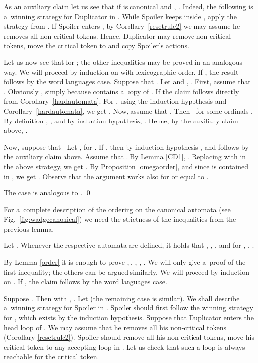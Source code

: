 \documentclass{LMCS}
\begin{document}
\proof As an auxiliary claim let us see that if  is canonical and , . Indeed, the following is a~winning strategy for Duplicator in . While Spoiler keeps inside , apply the strategy from . If Spoiler enters , by Corollary~\ref{resetrule2} we may assume he removes all non-critical tokens. Hence, Duplicator may remove non-critical tokens, move the critical token to  and copy Spoiler's actions. 

Let us now see that  for ; the other inequalities may be proved in an analogous way. We will proceed by induction on  with lexicographic order. If , the result follows by the word languages case. Suppose that . Let  and , .  First, assume that . Obviously , simply because  contains a~copy of . If  the claim follows directly from Corollary~\ref{hardautomata}. For , using the induction hypothesis and Corollary~\ref{hardautomata}, we get . Now, assume that . Then ,  for some ordinals . By definition , , and by induction hypothesis, . Hence, by the auxiliary claim above, .

Now, suppose that . Let ,  for  . If  , then by induction hypothesis , and   follows by the auxiliary claim above.  Assume that . By Lemma \ref{CD1}, . Replacing  with  in the above strategy, we get . By Proposition \ref{omegaorder},  and  since  is contained in , we get . Observe that the argument works also for  or  equal to .

The case  is analogous to . \qed

\vspace{5pt}

For a~complete description of the ordering on the canonical automata (see Fig.~\ref{fig:wadgecanonical}) we need the strictness of the inequalities from the previous lemma.

\begin{thm} \label{strictorder}
Let . Whenever the respective automata are defined, it holds that  , , , and  for ,  , .
\end{thm}

\proof By Lemma \ref{order} it is enough to prove , , , , . We will only give a~proof of the first inequality; the others can be argued similarly.  We will proceed by induction on . If , the claim follows by the word languages case.

Suppose . Then   with , . Let  (the remaining case is similar). We shall describe a~winning strategy for Spoiler in . Spoiler should first follow the winning strategy for , which exists by the induction hypothesis. Suppose that Duplicator enters the head loop of . We may assume that he removes all his non-critical tokens (Corollary \ref{resetrule2}). Spoiler should remove all his non-critical tokens, move his critical token to any accepting loop in . Let us check that such a loop is always reachable for the critical token. 
\end{document}
